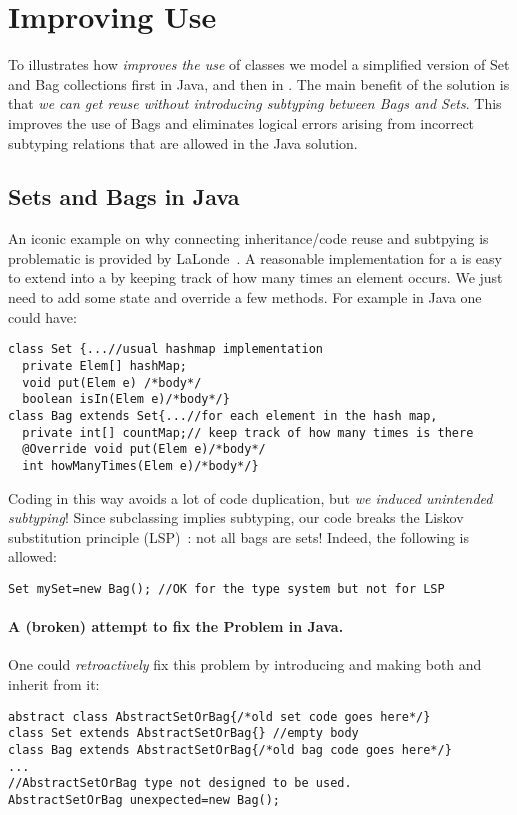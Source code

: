 \section{Improving Use}

To illustrates how 
\name \emph{improves the use} of classes we model a simplified version of
Set and Bag collections first in Java, and then in \name.
The main benefit of the \name solution is that \emph{we can get reuse 
without introducing subtyping between Bags and Sets}. This improves the 
use of Bags and eliminates logical errors arising from incorrect
subtyping relations that are allowed in the Java solution. 

\subsection{Sets and Bags in Java}
An iconic example on why connecting inheritance/code reuse and
subtpying is problematic is provided by
LaLonde~\cite{LaLonde:1991:SSS:110673.110679}.  A reasonable
implementation for a \Q@Set@ is easy to extend into a \Q@Bag@ by
keeping track of how many times an element occurs.  We just need to
add some state and override a few methods.
For example in Java one could have:

\begin{lstlisting}
class Set {...//usual hashmap implementation
  private Elem[] hashMap;
  void put(Elem e) /*body*/
  boolean isIn(Elem e)/*body*/}
class Bag extends Set{...//for each element in the hash map,
  private int[] countMap;// keep track of how many times is there
  @Override void put(Elem e)/*body*/
  int howManyTimes(Elem e)/*body*/}
\end{lstlisting}

\noindent Coding \Q@Bag@ in this way avoids a lot of code
duplication, but \emph{we induced unintended subtyping}! 
Since subclassing implies subtyping, our code breaks the Liskov substitution principle (LSP)~\cite{martin2000design}: not all bags are sets!
Indeed, the following is allowed:

\begin{lstlisting}
Set mySet=new Bag(); //OK for the type system but not for LSP
\end{lstlisting}


\paragraph{A (broken) attempt to fix the Problem in Java.}
One could \emph{retroactively} fix this problem by introducing \Q@AbstractSetOrBag@
and making both \Q@Bag@ and \Q@Set@ inherit from it:
\begin{lstlisting}
abstract class AbstractSetOrBag{/*old set code goes here*/}
class Set extends AbstractSetOrBag{} //empty body
class Bag extends AbstractSetOrBag{/*old bag code goes here*/}
...
//AbstractSetOrBag type not designed to be used.
AbstractSetOrBag unexpected=new Bag(); 
\end{lstlisting}

